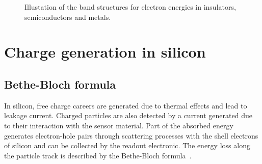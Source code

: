 \begin{figure}[htbp]
  \centering
  \caption{Illustation of the band structures for electron energies in
  insulators, semiconductors and metals.}  
  \label{fig:energyBands}
\end{figure}

\section{Charge generation in silicon}

\subsection{Bethe-Bloch formula}
In silicon, free charge careers are generated due to thermal effects
and lead to leakage current. Charged particles are also detected by a
current generated due to their interaction with the sensor
material. Part of the absorbed energy generates electron-hole pairs
through scattering processes with the shell electrons of silicon and
can be collected by the readout electronic. The energy loss along the
particle track is described by the Bethe-Bloch
formula~\cite{Beringer:1900zz}.

